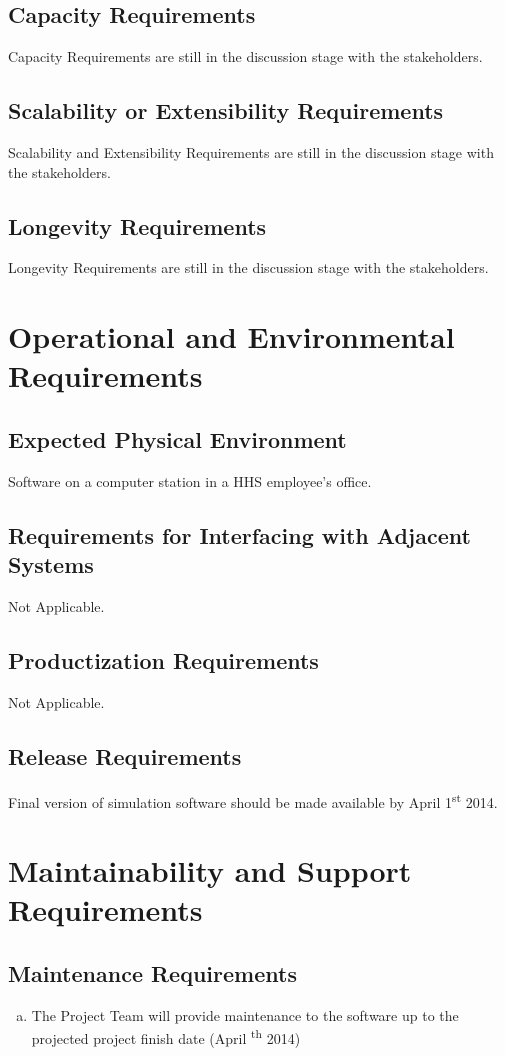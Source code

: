 \documentclass[paper=letter, fontsize=10pt]{scrartcl}
\numberwithin{equation}{section}		%
\numberwithin{figure}{section}			%
\numberwithin{table}{section}				%
\newcommand{\ts}{\textsuperscript}
\begin{document}
\subsection{Capacity Requirements}
Capacity Requirements are still in the discussion stage with the stakeholders.
\subsection{Scalability or Extensibility Requirements}
Scalability and Extensibility Requirements are still in the discussion stage with the stakeholders.
\subsection{Longevity Requirements}
Longevity Requirements are still in the discussion stage with the stakeholders.

\section{Operational and Environmental Requirements}
\subsection{Expected Physical Environment}
Software on a computer station in a HHS employee's office.
\subsection{Requirements for Interfacing with Adjacent Systems}
Not Applicable.
\subsection{Productization Requirements}
Not Applicable.
\subsection{Release Requirements}
Final version of simulation software should be made available by April 1\ts{st} 2014.

\section{Maintainability and Support Requirements}
\subsection{Maintenance Requirements}
	\begin{enumerate}[(a)]
		\item The Project Team will provide maintenance to the software up to the projected project finish date (April \ts{th} 2014)
	\end{enumerate}
\end{document}
